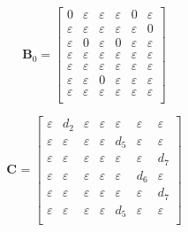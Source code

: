 \documentclass[11pt, a4paper, fleqn]{article}
\begin{document}
\begin{equation*}
\mathbf{B}_{0} = 
\left[\begin{array}{ cccccc }
0	&\varepsilon	&\varepsilon	&\varepsilon	&0	&\varepsilon\\
\varepsilon	&\varepsilon	&\varepsilon	&\varepsilon	&\varepsilon	&0\\
\varepsilon	&0	&\varepsilon	&0	&\varepsilon	&\varepsilon\\
\varepsilon	&\varepsilon	&\varepsilon	&\varepsilon	&\varepsilon	&\varepsilon\\
\varepsilon	&\varepsilon	&\varepsilon	&\varepsilon	&\varepsilon	&\varepsilon\\
\varepsilon	&\varepsilon	&0	&\varepsilon	&\varepsilon	&\varepsilon\\
\varepsilon	&\varepsilon	&\varepsilon	&\varepsilon	&\varepsilon	&\varepsilon\\
\end{array}\right]
\end{equation*}

\begin{equation*}
\mathbf{C}_{{}} = 
\left[\begin{array}{ ccccccc }
\varepsilon	&d_2	&\varepsilon	&\varepsilon	&\varepsilon	&\varepsilon	&\varepsilon\\
\varepsilon	&\varepsilon	&\varepsilon	&\varepsilon	&d_5	&\varepsilon	&\varepsilon\\
\varepsilon	&\varepsilon	&\varepsilon	&\varepsilon	&\varepsilon	&\varepsilon	&d_7\\
\varepsilon	&\varepsilon	&\varepsilon	&\varepsilon	&\varepsilon	&d_6	&\varepsilon\\
\varepsilon	&\varepsilon	&\varepsilon	&\varepsilon	&\varepsilon	&\varepsilon	&d_7\\
\varepsilon	&\varepsilon	&\varepsilon	&\varepsilon	&d_5	&\varepsilon	&\varepsilon\\
\end{array}\right]
\end{equation*}
\end{document}
